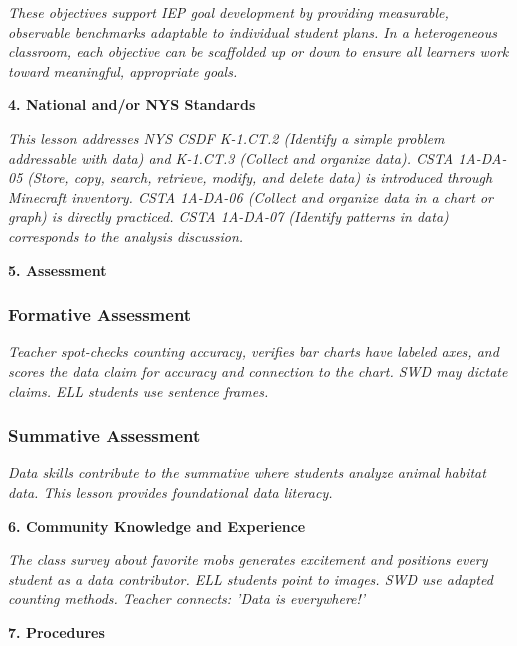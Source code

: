 \documentclass[11pt,letterpaper]{article}
\begin{document}
\textit{These objectives support IEP goal development by providing measurable, observable benchmarks adaptable to individual student plans. In a heterogeneous classroom, each objective can be scaffolded up or down to ensure all learners work toward meaningful, appropriate goals.}

\textbf{4. National and/or NYS Standards}

\textit{This lesson addresses NYS CSDF K-1.CT.2 (Identify a simple problem addressable with data) and K-1.CT.3 (Collect and organize data). CSTA 1A-DA-05 (Store, copy, search, retrieve, modify, and delete data) is introduced through Minecraft inventory. CSTA 1A-DA-06 (Collect and organize data in a chart or graph) is directly practiced. CSTA 1A-DA-07 (Identify patterns in data) corresponds to the analysis discussion.}

\newpage
\textbf{5. Assessment}

\subsubsection{Formative Assessment}

\textit{Teacher spot-checks counting accuracy, verifies bar charts have labeled axes, and scores the data claim for accuracy and connection to the chart. SWD may dictate claims. ELL students use sentence frames.}

\subsubsection{Summative Assessment}

\textit{Data skills contribute to the summative where students analyze animal habitat data. This lesson provides foundational data literacy.}

\textbf{6. Community Knowledge and Experience}

\textit{The class survey about favorite mobs generates excitement and positions every student as a data contributor. ELL students point to images. SWD use adapted counting methods. Teacher connects: 'Data is everywhere!'}

\textbf{7. Procedures}
\end{document}
